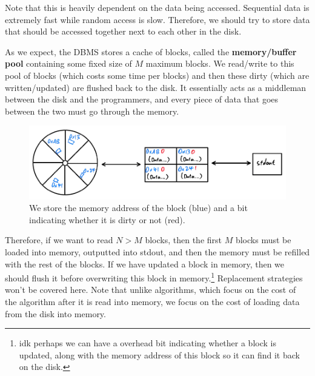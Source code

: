 \documentclass{article}
\begin{document}
    Note that this is heavily dependent on the data being accessed. Sequential data is extremely fast while random access is slow. Therefore, we should try to store data that should be accessed together next to each other in the disk.  

    \begin{definition}
      As we expect, the DBMS stores a cache of blocks, called the \textbf{memory/buffer pool} containing some fixed size of $M$ maximum blocks. We read/write to this pool of blocks (which costs some time per blocks) and then these dirty (which are written/updated) are flushed back to the disk. It essentially acts as a middleman between the disk and the programmers, and every piece of data that goes between the two must go through the memory. 

      \begin{figure}[H]
        \centering 
        \includegraphics[scale=0.4]{img/disk_memory.png}
        \caption{We store the memory address of the block (blue) and a bit indicating whether it is dirty or not (red). } 
        \label{fig:disk_memory}
      \end{figure}
    \end{definition}

    Therefore, if we want to read $N > M$ blocks, then the first $M$ blocks must be loaded into memory, outputted into stdout, and then the memory must be refilled with the rest of the blocks. If we have updated a block in memory, then we should flush it before overwriting this block in memory.\footnote{idk perhaps we can have a overhead bit indicating whether a block is updated, along with the memory address of this block so it can find it back on the disk.} Replacement strategies won't be covered here. Note that unlike algorithms, which focus on the cost of the algorithm after it is read into memory, we focus on the cost of loading data from the disk into memory. 
\end{document}
